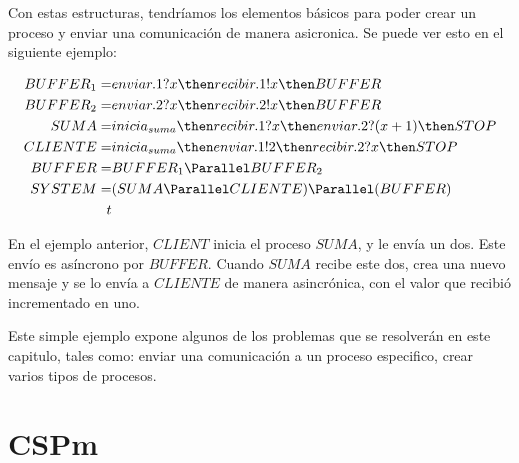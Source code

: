 Con estas estructuras, tendríamos los elementos básicos para poder crear un proceso y enviar una comunicación de manera asicronica. Se puede ver esto en el siguiente ejemplo:

\begin{align*}
BUFFER_1 =& enviar.1?x \then recibir.1!x \then BUFFER\\
BUFFER_2 =& enviar.2?x \then recibir.2!x \then BUFFER\\
SUMA =& inicia_{suma} \then recibir.1?x \then enviar.2?(x + 1) \then STOP \\
CLIENTE =& inicia_{suma}\then enviar.1!2 \then recibir.2?x \then STOP \\
BUFFER =& BUFFER_1 \Parallel BUFFER_2 \\
SYSTEM =& (SUMA \Parallel CLIENTE) \Parallel (BUFFER)\\t
\end{align*}

En el ejemplo anterior, $CLIENT$ inicia el proceso $SUMA$, y le envía un dos. Este envío es asíncrono por $BUFFER$. Cuando $SUMA$ recibe este dos, crea una nuevo mensaje y se lo envía a $CLIENTE$ de manera asincrónica, con el valor que recibió incrementado en uno.

Este simple ejemplo expone algunos de los problemas que se resolverán en este capitulo, tales como: enviar una comunicación a un proceso especifico, crear varios tipos de procesos.

\section{CSPm}

